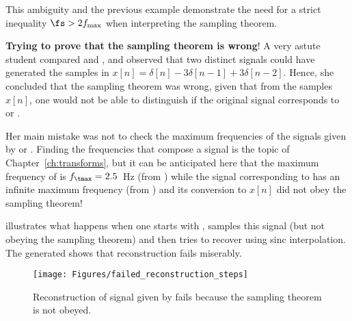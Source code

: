 This ambiguity and the previous example demonstrate the need for a strict inequality $\fs > 2 f_{\textrm{max}}$ when interpreting the 
sampling theorem.
\eExample 


\bExample \textbf{Trying to prove that the sampling theorem is wrong}!
A very astute student compared  and , and observed that
two distinct signals could have generated the samples in $x[n]=\delta[n]-3\delta[n-1]+3\delta[n-2]$.
Hence, she concluded that the sampling theorem was wrong, given that from the samples $x[n]$, one
would not be able to distinguish if the original signal corresponds to 
 or .

Her main mistake was not to check the maximum frequencies of the signals given by  or .
Finding the frequencies that compose a signal is the topic of Chapter~\ref{ch:transforms}, but it can be anticipated
here that the maximum frequency of  is $f_\tmax = 2.5$~Hz (from ) while the signal corresponding to  has an infinite maximum frequency (from ) and
its conversion to $x[n]$ did not obey the sampling theorem!

 illustrates what happens when one starts with ,
samples this signal (but not obeying the sampling theorem) and then tries to recover 
using sinc interpolation. The generated  shows that reconstruction fails miserably.


\begin{figure}
	\centering
		\texttt{[image: Figures/failed\_reconstruction\_steps]}		
	\caption{Reconstruction of signal given by  fails because the sampling theorem is not obeyed.\label{fig:failed_reconstruction_steps}}
\end{figure}

